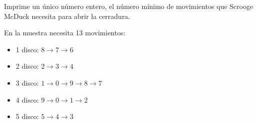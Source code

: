 \outputText

Imprime un único número entero, el número mínimo de movimientos que Scrooge McDuck necesita para abrir la cerradura.

\exampleCases

\begin{example}
\end{example}

\explanationText

En la muestra necesita 13 movimientos:
\begin{itemize}
    \item 1 disco: $8 \longrightarrow 7 \longrightarrow 6$
    \item 2 disco: $2 \longrightarrow 3 \longrightarrow 4$
    \item 3 disco: $1 \longrightarrow 0 \longrightarrow 9 \longrightarrow 8 \longrightarrow 7$
    \item 4 disco: $9 \longrightarrow 0 \longrightarrow 1 \longrightarrow 2$
    \item 5 disco: $5 \longrightarrow 4 \longrightarrow 3$
\end{itemize}
